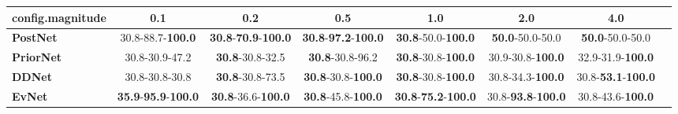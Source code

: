 \begin{tabular}{lccccccc}
\toprule
\textbf{config.magnitude} &                                         0.1 &                                         0.2 &                                         0.5 &                                         1.0 &                                2.0 &                                4.0 \\
\midrule
\textbf{PostNet } &                    30.8-88.7-\textbf{100.0} &  \textbf{30.8}-\textbf{70.9}-\textbf{100.0} &  \textbf{30.8}-\textbf{97.2}-\textbf{100.0} &           \textbf{30.8}-50.0-\textbf{100.0} &            \textbf{50.0}-50.0-50.0 &            \textbf{50.0}-50.0-50.0 \\
\textbf{PriorNet} &                              30.8-30.9-47.2 &                     \textbf{30.8}-30.8-32.5 &                     \textbf{30.8}-30.8-96.2 &           \textbf{30.8}-30.8-\textbf{100.0} &           30.9-30.8-\textbf{100.0} &           32.9-31.9-\textbf{100.0} \\
\textbf{DDNet   } &                              30.8-30.8-30.8 &                     \textbf{30.8}-30.8-73.5 &           \textbf{30.8}-30.8-\textbf{100.0} &           \textbf{30.8}-30.8-\textbf{100.0} &           30.8-34.3-\textbf{100.0} &  30.8-\textbf{53.1}-\textbf{100.0} \\
\textbf{EvNet   } &  \textbf{35.9}-\textbf{95.9}-\textbf{100.0} &           \textbf{30.8}-36.6-\textbf{100.0} &           \textbf{30.8}-45.8-\textbf{100.0} &  \textbf{30.8}-\textbf{75.2}-\textbf{100.0} &  30.8-\textbf{93.8}-\textbf{100.0} &           30.8-43.6-\textbf{100.0} \\
\bottomrule
\end{tabular}
